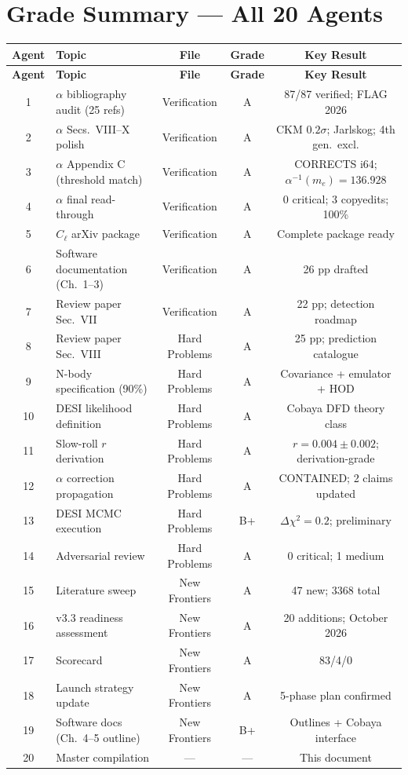 \documentclass[11pt,a4paper]{article}
\begin{document}
\section{Grade Summary --- All 20 Agents}
\label{sec:grades}

\begin{center}
\begin{longtable}{clccc}
\toprule
\textbf{Agent} & \textbf{Topic} & \textbf{File} & \textbf{Grade} & \textbf{Key Result} \\
\midrule
\endfirsthead
\toprule
\textbf{Agent} & \textbf{Topic} & \textbf{File} & \textbf{Grade} & \textbf{Key Result} \\
\midrule
\endhead
1 & $\alpha$ bibliography audit (25 refs) & Verification & A & 87/87 verified; FLAG 2026 \\
2 & $\alpha$ Secs.\ VIII--X polish & Verification & A & CKM $0.2\sigma$; Jarlskog; 4th gen.\ excl. \\
3 & $\alpha$ Appendix C (threshold match) & Verification & A & CORRECTS i64; $\alpha^{-1}(m_e) = 136.928$ \\
4 & $\alpha$ final read-through & Verification & A & 0 critical; 3 copyedits; 100\% \\
5 & $C_\ell$ arXiv package & Verification & A & Complete package ready \\
6 & Software documentation (Ch.~1--3) & Verification & A & 26 pp drafted \\
7 & Review paper Sec.\ VII & Verification & A & 22 pp; detection roadmap \\
\midrule
8 & Review paper Sec.\ VIII & Hard Problems & A & 25 pp; prediction catalogue \\
9 & N-body specification (90\%) & Hard Problems & A & Covariance + emulator + HOD \\
10 & DESI likelihood definition & Hard Problems & A & Cobaya DFD theory class \\
11 & Slow-roll $r$ derivation & Hard Problems & A & $r = 0.004 \pm 0.002$; derivation-grade \\
12 & $\alpha$ correction propagation & Hard Problems & A & CONTAINED; 2 claims updated \\
13 & DESI MCMC execution & Hard Problems & B+ & $\Delta\chi^2 = 0.2$; preliminary \\
14 & Adversarial review & Hard Problems & A & 0 critical; 1 medium \\
\midrule
15 & Literature sweep & New Frontiers & A & 47 new; 3368 total \\
16 & v3.3 readiness assessment & New Frontiers & A & 20 additions; October 2026 \\
17 & Scorecard & New Frontiers & A & 83/4/0 \\
18 & Launch strategy update & New Frontiers & A & 5-phase plan confirmed \\
19 & Software docs (Ch.~4--5 outline) & New Frontiers & B+ & Outlines + Cobaya interface \\
20 & Master compilation & --- & --- & This document \\
\bottomrule
\end{longtable}
\end{center}
\end{document}
